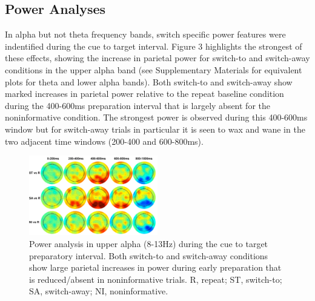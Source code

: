 \documentclass[preprint,authoryear,11pt,5p,times,twocolumns]{elsarticle}
\begin{document}
\subsection{Power Analyses}
In alpha but not theta frequency bands, switch specific power features were indentified during the cue to target interval. Figure 3 highlights the strongest of these effects, showing the increase in parietal power for switch-to and switch-away conditions in the upper alpha band (see Supplementary Materials for equivalent plots for theta and lower alpha bands).
Both switch-to and switch-away show marked increases in parietal power relative to the repeat baseline condition during the 400-600ms preparation interval that is largely absent for the noninformative condition. The strongest power is observed during this 400-600ms window but for switch-away trials in particular it is seen to wax and wane in the two adjacent time windows (200-400 and 600-800ms).
\begin{figure}
\centering
\includegraphics[width =0.5\textwidth]{UpperAlphaPower.pdf}
\caption{Power analysis in upper alpha (8-13Hz) during the cue to target preparatory interval. Both switch-to and switch-away conditions show large parietal increases in power during early preparation that is reduced/absent in noninformative trials. R, repeat; ST, switch-to; SA, switch-away; NI, noninformative.}
\label{Power}
\end{figure} 
\end{document}
